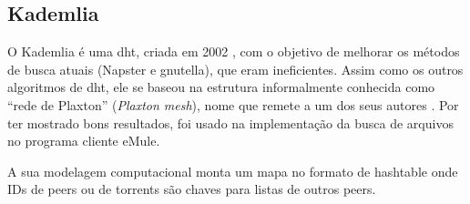
\subsection*{Kademlia}

O Kademlia é uma \gls*{dht}, criada em 2002 \cite{artigo:kademlia}, com o objetivo de
melhorar os métodos de busca atuais (Napster e \gls*{gnutella}), que eram ineficientes.
Assim como os outros algoritmos de \gls*{dht}, ele se baseou na estrutura informalmente
conhecida como \enquote{rede de Plaxton} (\emph{Plaxton mesh}), nome que remete a um
dos seus autores \cite{artigo:dht}. Por ter mostrado bons resultados, foi usado na
implementação da busca de arquivos no programa cliente eMule.

A sua modelagem computacional monta um mapa no formato de \gls*{hashtable} onde IDs de
\glspl*{peer} ou de \glspl*{torrent} são chaves para listas de outros \glspl*{peer}.









